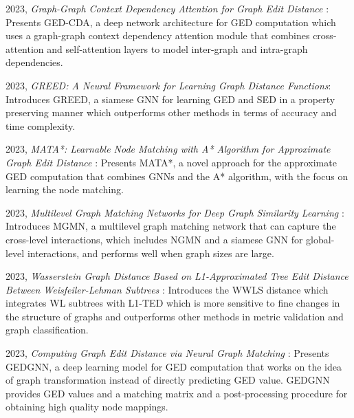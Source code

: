 \documentclass[../Thesis.tex]{subfiles}
\begin{document}
	2023, \textit{Graph-Graph Context Dependency Attention for Graph Edit Distance} \cite{graph_graph_context_dependency_attention_for_graph_edit_distance}: Presents GED-CDA, a deep network architecture for GED computation which uses a graph-graph context dependency attention module that combines cross-attention and self-attention layers to model inter-graph and intra-graph dependencies.
	
	2023, \textit{GREED: A Neural Framework for Learning Graph Distance Functions}: Introduces GREED, a siamese GNN for learning GED and SED in a property preserving manner which outperforms other methods in terms of accuracy and time complexity.
	
	2023, \textit{MATA*: Learnable Node Matching with A* Algorithm for Approximate Graph Edit Distance} \cite{mata_combining_learnable_node_matching_with_a*_algorithm_for_approximate_graph_edit_distance}: Presents MATA*, a novel approach for the approximate GED computation that combines GNNs and the A* algorithm, with the focus on learning the node matching.
	
	2023, \textit{Multilevel Graph Matching Networks for Deep Graph Similarity Learning} \cite{multilevel_graph_matching_networks_for_deep_graph_similarity_learning}: Introduces MGMN, a multilevel graph matching network that can capture the cross-level interactions, which includes NGMN and a siamese GNN for global-level interactions, and performs well when graph sizes are large.
	
	2023, \textit{Wasserstein Graph Distance Based on L1-Approximated Tree Edit Distance Between Weisfeiler-Lehman Subtrees} \cite{wasserstein_graph_distance_based_on_l1_approximated_tree_edit_distance_between_weisfeiler_lehman_subtrees}: Introduces the WWLS distance which integrates WL subtrees with L1-TED which is more sensitive to fine changes in the structure of graphs and outperforms other methods in metric validation and graph classification.
	
	2023, \textit{Computing Graph Edit Distance via Neural Graph Matching} \cite{computing_graph_edit_distance_via_neural_graph_matching}: Presents GEDGNN, a deep learning model for GED computation that works on the idea of graph transformation instead of directly predicting GED value. GEDGNN provides GED values and a matching matrix and a post-processing procedure for obtaining high quality node mappings.
\end{document}
